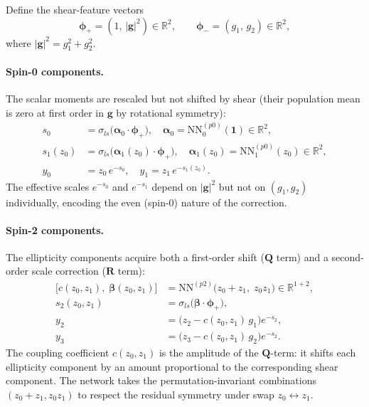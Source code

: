 Define the shear-feature vectors
\begin{equation}
  \boldsymbol{\phi}_+=(1,\,|\mathbf{g}|^2)\in\mathbb{R}^2,
  \qquad
  \boldsymbol{\phi}_-=(g_1,\,g_2)\in\mathbb{R}^2,
\end{equation}
where $|\mathbf{g}|^2=g_1^2+g_2^2$.

\paragraph{Spin-0 components.}
The scalar moments are rescaled but not shifted by shear (their population
mean is zero at first order in $\mathbf{g}$ by rotational symmetry):
\begin{align}
  s_0 &= \sigma_{ls}\!\bigl(\boldsymbol{\alpha}_0\cdot\boldsymbol{\phi}_+\bigr),
  \quad
  \boldsymbol{\alpha}_0=\mathrm{NN}^{(p0)}_0(\mathbf{1})
  \in\mathbb{R}^2,\label{eq:poly_s0}\\
  s_1(z_0) &= \sigma_{ls}\!\bigl(\boldsymbol{\alpha}_1(z_0)\cdot\boldsymbol{\phi}_+\bigr),
  \quad
  \boldsymbol{\alpha}_1(z_0)=\mathrm{NN}^{(p0)}_1(z_0)
  \in\mathbb{R}^2,\label{eq:poly_s1}\\
  y_0 &= z_0\,e^{-s_0},\quad y_1 = z_1\,e^{-s_1(z_0)}.\label{eq:poly_y01}
\end{align}
The effective scales $e^{-s_0}$ and $e^{-s_1}$ depend on $|\mathbf{g}|^2$ but
not on $(g_1,g_2)$ individually, encoding the even (spin-0) nature of the
correction.

\paragraph{Spin-2 components.}
The ellipticity components acquire both a first-order shift ($\mathbf{Q}$ term)
and a second-order scale correction ($\mathbf{R}$ term):
\begin{align}
  \bigl[c(z_0,z_1),\;\boldsymbol{\beta}(z_0,z_1)\bigr]
    &= \mathrm{NN}^{(p2)}\!\bigl(z_0+z_1,\;z_0 z_1\bigr)
    \in\mathbb{R}^{1+2},\label{eq:poly_net2}\\
  s_2(z_0,z_1) &= \sigma_{ls}\!\bigl(\boldsymbol{\beta}\cdot\boldsymbol{\phi}_+\bigr),\label{eq:poly_s2}\\
  y_2 &= \bigl(z_2 - c(z_0,z_1)\,g_1\bigr)e^{-s_2},\label{eq:poly_y2}\\
  y_3 &= \bigl(z_3 - c(z_0,z_1)\,g_2\bigr)e^{-s_2}.\label{eq:poly_y3}
\end{align}
The coupling coefficient $c(z_0,z_1)$ is the amplitude of the
$\mathbf{Q}$-term: it shifts each ellipticity component by an amount proportional
to the corresponding shear component.  The network takes the
permutation-invariant combinations $(z_0+z_1,z_0 z_1)$ to respect the
residual symmetry under swap $z_0\leftrightarrow z_1$.

